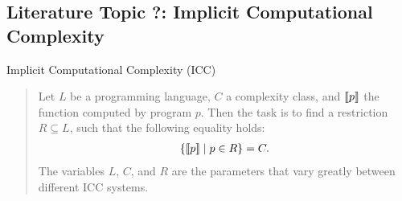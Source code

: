 \subsection{Literature Topic ?: Implicit Computational Complexity}
\label{subsec:icc}

Implicit Computational Complexity (ICC)~\cite{dallago2011}

\begin{quote}
Let \(L\) be a programming language, \(C\) a complexity class, and \(\llbracket p\rrbracket\) the function computed by program \(p\).
Then the task is to find a restriction \(R \subseteq L\), such that the following equality holds:
\begin{align*}
\{ \llbracket p\rrbracket \mid p \in R \} = C.
\end{align*}
The variables \(L\), \(C\), and \(R\) are the parameters that vary greatly between different ICC systems.
\end{quote}